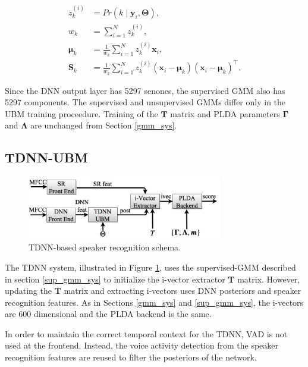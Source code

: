 \documentclass{article}
\begin{document}
\begin{equation}
\label{eq:sup_gmm_eq} 
\begin{split}
z_{k}^{(i)} &= Pr(k \mid \boldsymbol{y}_{i}, \boldsymbol{\Theta}), \\
w_{k} &= \sum_{i=1}^{N}z_{k}^{(i)},\\
\boldsymbol{\mu}_{k} &= \frac{1}{w_{k}} \sum_{i=1}^{N} z_{k}^{(i)} \boldsymbol{x}_{i},\\
\boldsymbol{S}_{k} &= \frac{1}{w_{k}} \sum_{i=1}^{N} z_{k}^{(i)} (\boldsymbol{x}_{i} - \boldsymbol{\mu}_{k}) (\boldsymbol{x}_{i} - \boldsymbol{\mu}_{k})^{\top}.
\end{split}
\end{equation}

Since the DNN output layer has 5297 senones, the supervised GMM also has 5297
components. The supervised and unsupervised GMMs differ only
in the UBM training proceedure. Training of the $\boldsymbol{T}$ matrix
and PLDA parameters $\boldsymbol{\Gamma}$ and $\boldsymbol{\Lambda}$ are unchanged from Section \ref{gmm_sys}.

\subsection{TDNN-UBM}

\begin{figure}[th]
\centerline{\includegraphics[width=8.5cm]{fig/dnn_schema}}
\caption{TDNN-based speaker recognition schema.}
\label{fig:dnn_schema}
\end{figure}

The TDNN system, illustrated in Figure \ref{fig:dnn_schema},
uses the supervised-GMM described in 
section \ref{sup_gmm_sys} to initialize the i-vector 
extractor $\boldsymbol{T}$ matrix.
However, updating the $\boldsymbol{T}$ matrix and extracting 
i-vectors uses DNN posteriors and 
speaker recognition features. As in Sections \ref{gmm_sys} and \ref{sup_gmm_sys},
 the i-vectors are 600 dimensional and the PLDA backend is the same.

In order to maintain the correct temporal context for the TDNN, VAD
is not used at the frontend. Instead, the voice activity detection from the speaker recognition
features are reused to filter the posteriors of the network.
\end{document}
